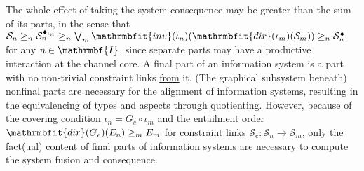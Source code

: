 \documentclass{amsart}
\def\to{\rightarrow}
\theoremstyle{remark}
\theoremstyle{definition}
\begin{document}
The whole effect of taking the system consequence may be greater than the sum of its parts,
in the sense that
$\mathcal{S}_{n} 
\geq_{n} 
\mathcal{S}_{n}^{{\scriptscriptstyle\blacklozenge}_{\iota_{n}}}
\geq_{n} \bigvee_{m}\mathrmbfit{inv}(\iota_{n})(\mathrmbfit{dir}(\iota_{m})(\mathcal{S}_{m})) 
\geq_{n} \mathcal{S}^{\scriptscriptstyle\blacklozenge}_{n}$ 
for any $n \in \mathrmbf{I}$,
since separate parts may have a productive interaction at the channel core.
%
A final part of an information system is a part with no non-trivial constraint links \underline{from} it. 
(The graphical subsystem beneath) nonfinal parts are necessary for the alignment of information systems,
resulting in the equivalencing of types and aspects through quotienting.
However,
because of 
the covering condition $\iota_{n} = G_{e} \circ \iota_{m}$ and
the entailment order $\mathrmbfit{dir}(G_{e})(E_{n}) \geq_{m} E_{m}$
for constraint links $\mathcal{S}_{e} \colon \mathcal{S}_{n} \to \mathcal{S}_{m}$,
only the fact(ual) content of final parts of information systems are necessary to compute the system fusion and consequence.
%
\end{document}
